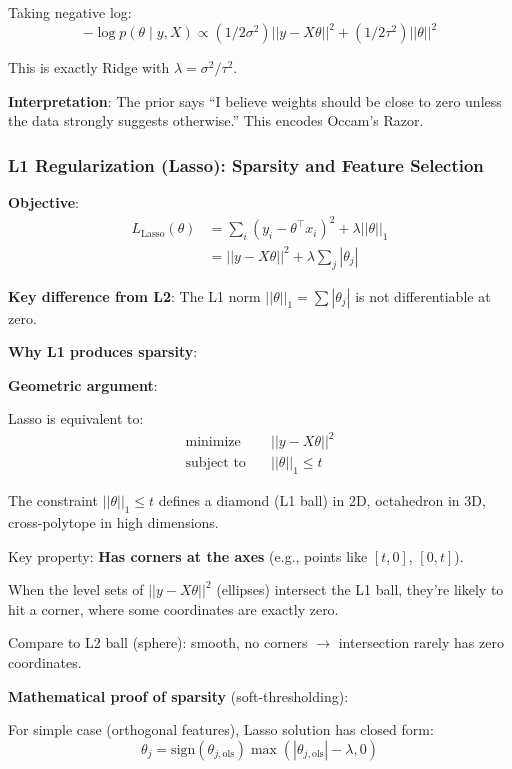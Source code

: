 \documentclass[11pt,oneside]{book}
\begin{document}
Taking negative log:
\begin{equation}
-\log p(\theta \mid y, X) \propto (1/2\sigma^2)||y - X\theta||^2 + (1/2\tau^2)||\theta||^2
\end{equation}

This is exactly Ridge with $\lambda = \sigma^2/\tau^2$.

\textbf{Interpretation}: The prior says ``I believe weights should be close to zero unless the data strongly suggests otherwise.'' This encodes Occam's Razor.

\subsubsection{L1 Regularization (Lasso): Sparsity and Feature Selection}

\textbf{Objective}:
\begin{align}
L_{\text{Lasso}}(\theta) &= \sum_{i} (y_i - \theta^\top x_i)^2 + \lambda||\theta||_1 \\
&= ||y - X\theta||^2 + \lambda\sum_{j} |\theta_j|
\end{align}

\textbf{Key difference from L2}: The L1 norm $||\theta||_1 = \sum|\theta_j|$ is not differentiable at zero.

\textbf{Why L1 produces sparsity}:

\textbf{Geometric argument}:

Lasso is equivalent to:
\begin{align}
\text{minimize} \quad & ||y - X\theta||^2 \\
\text{subject to} \quad & ||\theta||_1 \leq t
\end{align}

The constraint $||\theta||_1 \leq t$ defines a diamond (L1 ball) in 2D, octahedron in 3D, cross-polytope in high dimensions.

Key property: \textbf{Has corners at the axes} (e.g., points like $[t, 0]$, $[0, t]$).

When the level sets of $||y - X\theta||^2$ (ellipses) intersect the L1 ball, they're likely to hit a corner, where some coordinates are exactly zero.

Compare to L2 ball (sphere): smooth, no corners $\rightarrow$ intersection rarely has zero coordinates.

\textbf{Mathematical proof of sparsity} (soft-thresholding):

For simple case (orthogonal features), Lasso solution has closed form:
\begin{equation}
\theta_j = \text{sign}(\theta_{j,\text{ols}}) \max(|\theta_{j,\text{ols}}| - \lambda, 0)
\end{equation}
\end{document}
